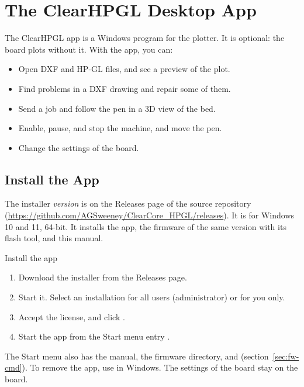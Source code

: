 \chapter{The ClearHPGL Desktop App}\label{ch:app}

The ClearHPGL app is a Windows program for the plotter. It is optional: the
board plots without it. With the app, you can:

\begin{itemize}
  \item Open DXF and HP-GL files, and see a preview of the plot.
  \item Find problems in a DXF drawing and repair some of them.
  \item Send a job and follow the pen in a 3D view of the bed.
  \item Enable, pause, and stop the machine, and move the pen.
  \item Change the settings of the board.
\end{itemize}

\section{Install the App}

The installer \textit{version} is on the
Releases page of the source repository
(\url{https://github.com/AGSweeney/ClearCore_HPGL/releases}). It is for
Windows 10 and 11, 64-bit. It installs the app, the firmware of the same
version with its flash tool, and this manual.

\begin{procedure}{Install the app}
\begin{enumerate}
  \item Download the installer from the Releases page.
  \item Start it. Select an installation for all users (administrator) or
        for you only.
  \item Accept the license, and click .
  \item Start the app from the Start menu entry .
\end{enumerate}
\end{procedure}

The Start menu also has the manual, the firmware directory, and
 (section~\ref{sec:fw-cmd}). To
remove the app, use  in Windows. The settings of the
board stay on the board.

